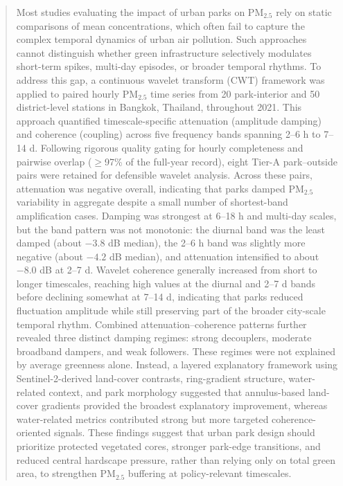 \documentclass[12pt,a4paper]{article}
\begin{document}
\begin{abstract}
Most studies evaluating the impact of urban parks on PM$_{2.5}$ rely on static comparisons of mean concentrations, which often fail to capture the complex temporal dynamics of urban air pollution. Such approaches cannot distinguish whether green infrastructure selectively modulates short-term spikes, multi-day episodes, or broader temporal rhythms. To address this gap, a continuous wavelet transform (CWT) framework was applied to paired hourly PM$_{2.5}$ time series from 20 park-interior and 50 district-level stations in Bangkok, Thailand, throughout 2021. This approach quantified timescale-specific attenuation (amplitude damping) and coherence (coupling) across five frequency bands spanning 2--6 h to 7--14 d. Following rigorous quality gating for hourly completeness and pairwise overlap ($\geq$97\% of the full-year record), eight Tier-A park--outside pairs were retained for defensible wavelet analysis. Across these pairs, attenuation was negative overall, indicating that parks damped PM$_{2.5}$ variability in aggregate despite a small number of shortest-band amplification cases. Damping was strongest at 6--18 h and multi-day scales, but the band pattern was not monotonic: the diurnal band was the least damped (about $-3.8$ dB median), the 2--6 h band was slightly more negative (about $-4.2$ dB median), and attenuation intensified to about $-8.0$ dB at 2--7 d. Wavelet coherence generally increased from short to longer timescales, reaching high values at the diurnal and 2--7 d bands before declining somewhat at 7--14 d, indicating that parks reduced fluctuation amplitude while still preserving part of the broader city-scale temporal rhythm. Combined attenuation--coherence patterns further revealed three distinct damping regimes: strong decouplers, moderate broadband dampers, and weak followers. These regimes were not explained by average greenness alone. Instead, a layered explanatory framework using Sentinel-2-derived land-cover contrasts, ring-gradient structure, water-related context, and park morphology suggested that annulus-based land-cover gradients provided the broadest explanatory improvement, whereas water-related metrics contributed strong but more targeted coherence-oriented signals. These findings suggest that urban park design should prioritize protected vegetated cores, stronger park-edge transitions, and reduced central hardscape pressure, rather than relying only on total green area, to strengthen PM$_{2.5}$ buffering at policy-relevant timescales.
\end{abstract}
\end{document}
